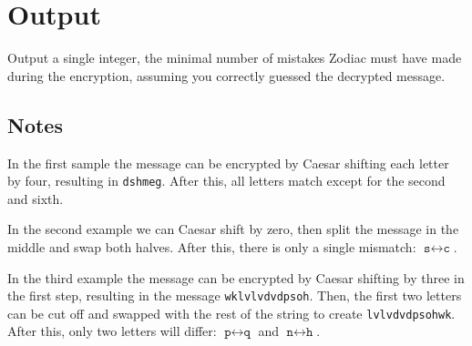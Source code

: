 \section*{Output}
Output a single integer, the minimal number of mistakes Zodiac must have made during the encryption,
assuming you correctly guessed the decrypted message.

\begin{afterSample}
	\section*{Notes}
	In the first sample the message can be encrypted by Caesar shifting each letter by four,
  resulting in \texttt{dshmeg}.
	After this, all letters match except for the second and sixth.
	
	In the second example we can Caesar shift by zero, then split the message in the middle and swap both halves.
  After this, there is only a single mismatch: $\texttt{s}\leftrightarrow{}\texttt{c}$.
	
	In the third example the message can be encrypted by Caesar shifting by three in the first step,
  resulting in the message \texttt{wklvlvdvdpsoh}.
  Then, the first two letters can be cut off and swapped with the rest of the string to create \texttt{lvlvdvdpsohwk}.
  After this, only two letters will differ: $\texttt{p}\leftrightarrow{}\texttt{q}$ and $\texttt{n}\leftrightarrow{}\texttt{h}$.
\end{afterSample}
